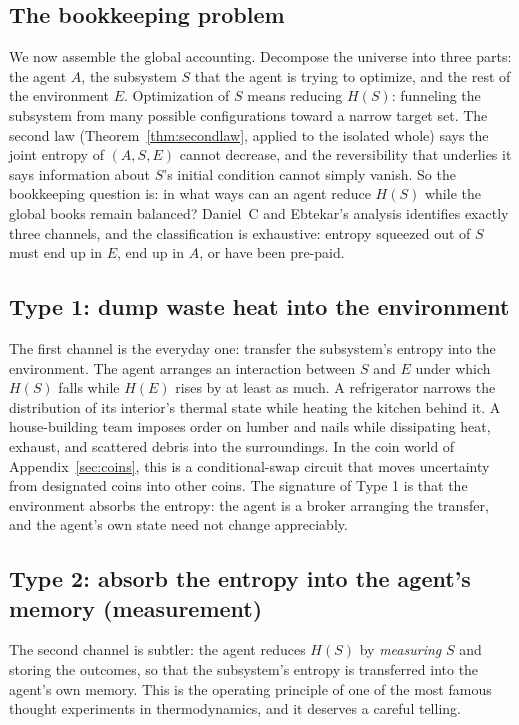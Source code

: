 \documentclass[10pt]{article}
\theoremstyle{definition}
\theoremstyle{remark}
\begin{document}
\subsection{The bookkeeping problem}
\label{sec:bookkeeping}

We now assemble the global accounting. Decompose the universe into three parts: the agent $A$, the subsystem $S$ that the agent is trying to optimize, and the rest of the environment $E$. Optimization of $S$ means reducing $H(S)$: funneling the subsystem from many possible configurations toward a narrow target set. The second law (Theorem~\ref{thm:secondlaw}, applied to the isolated whole) says the joint entropy of $(A, S, E)$ cannot decrease, and the reversibility that underlies it says information about $S$'s initial condition cannot simply vanish. So the bookkeeping question is: in what ways can an agent reduce $H(S)$ while the global books remain balanced? Daniel~C and Ebtekar's analysis identifies exactly three channels, and the classification is exhaustive: entropy squeezed out of $S$ must end up in $E$, end up in $A$, or have been pre-paid.

\subsection{Type 1: dump waste heat into the environment}
\label{sec:type1}

The first channel is the everyday one: transfer the subsystem's entropy into the environment. The agent arranges an interaction between $S$ and $E$ under which $H(S)$ falls while $H(E)$ rises by at least as much. A refrigerator narrows the distribution of its interior's thermal state while heating the kitchen behind it. A house-building team imposes order on lumber and nails while dissipating heat, exhaust, and scattered debris into the surroundings. In the coin world of Appendix~\ref{sec:coins}, this is a conditional-swap circuit that moves uncertainty from designated coins into other coins. The signature of Type 1 is that the environment absorbs the entropy: the agent is a broker arranging the transfer, and the agent's own state need not change appreciably.

\subsection{Type 2: absorb the entropy into the agent's memory (measurement)}
\label{sec:type2}

The second channel is subtler: the agent reduces $H(S)$ by \emph{measuring} $S$ and storing the outcomes, so that the subsystem's entropy is transferred into the agent's own memory. This is the operating principle of one of the most famous thought experiments in thermodynamics, and it deserves a careful telling.
\end{document}
